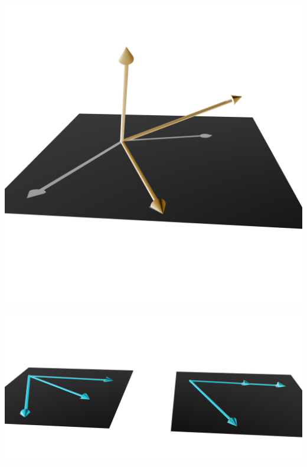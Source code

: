 \documentclass[pdf,9pt]{beamer}
\begin{document}
\begin{frame}
   \begin{center}
       \includegraphics[scale=0.07]{./figures/Vec-indep-neg.png}
   \end{center}
\end{frame}
\begin{frame}
   \begin{center}
       \includegraphics[scale=0.07]{./figures/Vec-dep-neg.png}
   \end{center}
\end{frame}
\end{document}

